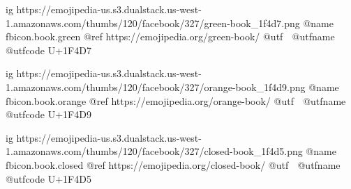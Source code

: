 
 
 
 
 

\ifcmt
	ig https://emojipedia-us.s3.dualstack.us-west-1.amazonaws.com/thumbs/120/facebook/327/green-book_1f4d7.png
	@name fbicon.book.green
	@ref https://emojipedia.org/green-book/
	@utf 📗
	@utfname
	@utfcode U+1F4D7

	ig https://emojipedia-us.s3.dualstack.us-west-1.amazonaws.com/thumbs/120/facebook/327/orange-book_1f4d9.png
	@name fbicon.book.orange
	@ref https://emojipedia.org/orange-book/
	@utf 📙
	@utfname
	@utfcode U+1F4D9

	ig https://emojipedia-us.s3.dualstack.us-west-1.amazonaws.com/thumbs/120/facebook/327/closed-book_1f4d5.png
	@name fbicon.book.closed
	@ref https://emojipedia.org/closed-book/
	@utf 📕
	@utfname
	@utfcode U+1F4D5
\fi
